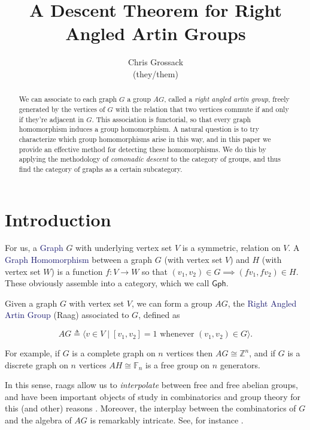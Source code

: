 \documentclass[12pt]{article}
\author{Chris Grossack\\ (they/them)}
\title{A Descent Theorem for Right Angled Artin Groups}
\theoremstyle{definition}
\theoremstyle{theorem}
\newcommand{\teq}{\triangleq}
\newcommand*{\important}[1]{\textcolor{MidnightBlue}{#1}}
\begin{document}
\maketitle

\begin{abstract}
  We can associate to each graph $G$ a group $AG$, called a
  \emph{right angled artin group}, freely generated by the vertices
  of $G$ with the relation that two vertices commute if and only if 
  they're adjacent in $G$. This association is functorial, so that 
  every graph homomorphism induces a group homomorphism. 
  A natural question is to try characterize which group homomorphisms
  arise in this way, and in this paper we provide an effective 
  method for detecting these homomorphisms. We do this by applying the
  methodology of \emph{comonadic descent} to the category of groups,
  and thus find the category of graphs as a certain subcategory.
\end{abstract}

\section{Introduction}
    For us, a \important{Graph} $G$ with underlying vertex set $V$ is a 
    symmetric, relation on $V$. A \important{Graph Homomorphism} between 
    a graph $G$ (with vertex set $V$) and $H$ (with vertex set $W$) is a 
    function $f : V \to W$ so that $(v_1, v_2) \in G \implies (f v_1, f v_2) \in H$.
    These obviously assemble into a category, which we call $\mathsf{Gph}$.

    Given a graph $G$ with vertex set $V$, we can form a group $AG$, the 
    \important{Right Angled Artin Group} (Raag) associated to $G$, defined as

    \[ AG \teq \langle v \in V \mid [v_1, v_2] = 1 \text{ whenever } (v_1,v_2) \in G \rangle .\]

    For example, if $G$ is a complete graph on $n$ vertices then 
    $AG \cong \mathbb{Z}^n$, and if $G$ is a discrete graph on $n$ vertices
    $AH \cong \mathbb{F}_n$ is a free group on $n$ generators. 

    In this sense, raags allow us to \emph{interpolate} between free and free
    abelian groups, and have been important objects of study in combinatorics
    and group theory for this (and other) reasons . 
    Moreover, the interplay between the combinatorics of $G$ and the 
    algebra of $AG$ is remarkably intricate. See, for instance 
    .
\end{document}
